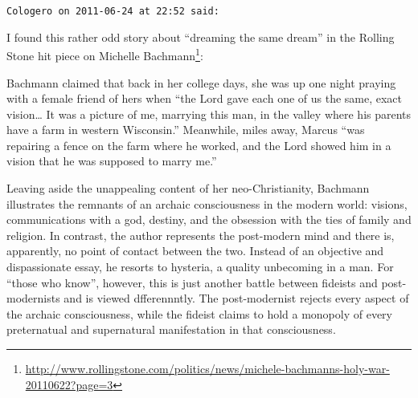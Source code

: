 \begin{footnotesize}\begin{sffamily}



\texttt{Cologero on 2011-06-24 at 22:52 said: }

I found this rather odd story about “dreaming the same dream” in the Rolling Stone hit piece on Michelle Bachmann\footnote{\url{http://www.rollingstone.com/politics/news/michele-bachmanns-holy-war-20110622?page=3}}:

\begin{quotex}
Bachmann claimed that back in her college days, she was up one night praying with a female friend of hers when “the Lord gave each one of us the same, exact vision… It was a picture of me, marrying this man, in the valley where his parents have a farm in western Wisconsin.” Meanwhile, miles away, Marcus “was repairing a fence on the farm where he worked, and the Lord showed him in a vision that he was supposed to marry me.”

\end{quotex}
Leaving aside the unappealing content of her neo-Christianity, Bachmann illustrates the remnants of an archaic consciousness in the modern world: visions, communications with a god, destiny, and the obsession with the ties of family and religion. In contrast, the author represents the post-modern mind and there is, apparently, no point of contact between the two. Instead of an objective and dispassionate essay, he resorts to hysteria, a quality unbecoming in a man. For “those who know”, however, this is just another battle between fideists and post-modernists and is viewed dfferennntly. The post-modernist rejects every aspect of the archaic consciousness, while the fideist claims to hold a monopoly of every preternatual and supernatural manifestation in that consciousness.


\end{sffamily}\end{footnotesize}
